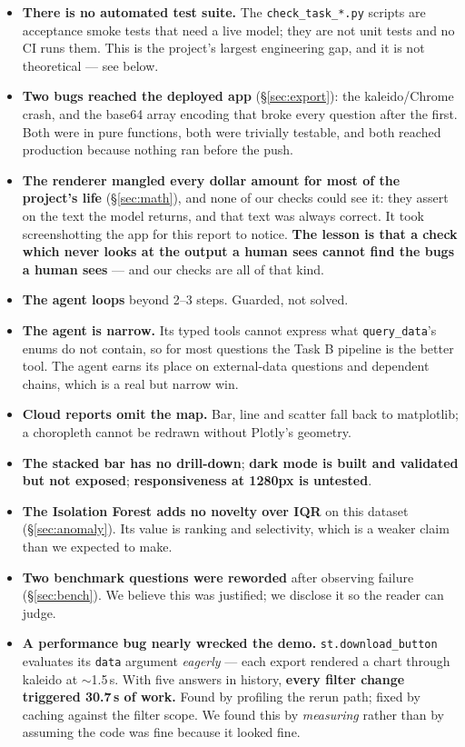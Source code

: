 \documentclass[11pt,a4paper]{article}
\begin{document}
\begin{itemize}[leftmargin=*]
\item \textbf{There is no automated test suite.} The \texttt{check\_task\_*.py} scripts
      are acceptance smoke tests that need a live model; they are not unit tests and no
      CI runs them. This is the project's largest engineering gap, and it is not
      theoretical --- see below.
\item \textbf{Two bugs reached the deployed app} (\S\ref{sec:export}): the kaleido/Chrome
      crash, and the base64 array encoding that broke every question after the first.
      Both were in pure functions, both were trivially testable, and both reached
      production because nothing ran before the push.
\item \textbf{The renderer mangled every dollar amount for most of the project's
      life} (\S\ref{sec:math}), and none of our checks could see it: they assert on
      the text the model returns, and that text was always correct. It took
      screenshotting the app for this report to notice. \textbf{The lesson is that a
      check which never looks at the output a human sees cannot find the bugs a human
      sees} --- and our checks are all of that kind.
\item \textbf{The agent loops} beyond 2--3 steps. Guarded, not solved.
\item \textbf{The agent is narrow.} Its typed tools cannot express what
      \texttt{query\_data}'s enums do not contain, so for most questions the Task B
      pipeline is the better tool. The agent earns its place on external-data questions
      and dependent chains, which is a real but narrow win.
\item \textbf{Cloud reports omit the map.} Bar, line and scatter fall back to
      matplotlib; a choropleth cannot be redrawn without Plotly's geometry.
\item \textbf{The stacked bar has no drill-down}; \textbf{dark mode is built and
      validated but not exposed}; \textbf{responsiveness at 1280px is untested}.
\item \textbf{The Isolation Forest adds no novelty over IQR} on this dataset
      (\S\ref{sec:anomaly}). Its value is ranking and selectivity, which is a weaker
      claim than we expected to make.
\item \textbf{Two benchmark questions were reworded} after observing failure
      (\S\ref{sec:bench}). We believe this was justified; we disclose it so the reader
      can judge.
\item \textbf{A performance bug nearly wrecked the demo.} \texttt{st.download\_button}
      evaluates its \texttt{data} argument \emph{eagerly} --- each export rendered a
      chart through kaleido at $\sim$1.5\,s. With five answers in history, \textbf{every
      filter change triggered 30.7\,s of work.} Found by profiling the rerun path; fixed
      by caching against the filter scope. We found this by \emph{measuring} rather than
      by assuming the code was fine because it looked fine.
\end{itemize}
\end{document}
